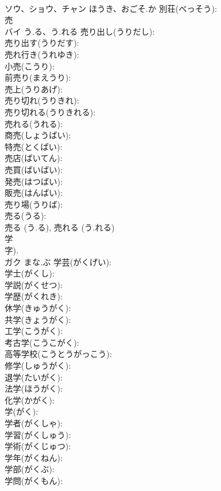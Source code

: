 \documentclass[8pt]{extreport}
\begin{document}
\begin{CJK}{UTF8}{min}
\\	ソウ、ショウ、チャン	ほうき、おごそ.か	別荘(べっそう): 
\\	売			
\\	バイ	う.る、う.れる	売り出し(うりだし): 
\\	売り出す(うりだす): 
\\	売れ行き(うれゆき): 
\\	小売(こうり): 
\\	前売り(まえうり): 
\\	売上(うりあげ): 
\\	売り切れ(うりきれ): 
\\	売り切れる(うりきれる): 
\\	売れる(うれる): 
\\	商売(しょうばい): 
\\	特売(とくばい): 
\\	売店(ばいてん): 
\\	売買(ばいばい): 
\\	発売(はつばい): 
\\	販売(はんばい): 
\\	売り場(うりば): 
\\	売る(うる): 
\\	売る (う.る), 売れる (う.れる)
\\	学			
\\	字).	
\\	ガク	まな.ぶ	学芸(がくげい): 
\\	学士(がくし): 
\\	学説(がくせつ): 
\\	学歴(がくれき): 
\\	休学(きゅうがく): 
\\	共学(きょうがく): 
\\	工学(こうがく): 
\\	考古学(こうこがく): 
\\	高等学校(こうとうがっこう): 
\\	修学(しゅうがく): 
\\	退学(たいがく): 
\\	法学(ほうがく): 
\\	化学(かがく): 
\\	学(がく): 
\\	学者(がくしゃ): 
\\	学習(がくしゅう): 
\\	学術(がくじゅつ): 
\\	学年(がくねん): 
\\	学部(がくぶ): 
\\	学問(がくもん): 

\end{CJK}
\end{document}
